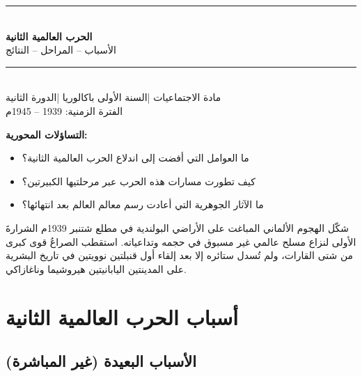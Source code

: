 \documentclass[12pt, a4paper]{article}
\begin{document}
\thispagestyle{empty}

\begin{center}
  {\color{mainblue}\rule{\linewidth}{2pt}}\\[6pt]
  {\LARGE\bfseries\color{mainblue} الحرب العالمية الثانية}\\[4pt]
  {\large\color{accentred} الأسباب – المراحل – النتائج}\\[6pt]
  {\color{mainblue}\rule{\linewidth}{2pt}}\\[10pt]
  {\normalsize\color{darkgray}
    مادة الاجتماعيات \quad|\quad السنة الأولى باكالوريا \quad|\quad الدورة الثانية}\\[4pt]
  {\small\color{darkgray} الفترة الزمنية: 1939 – 1945م}
\end{center}

\vspace{0.5cm}

\begin{sidebarbox}
\textbf{التساؤلات المحورية:}
\begin{itemize}[leftmargin=*, nosep]
  \item ما العوامل التي أفضت إلى اندلاع الحرب العالمية الثانية؟
  \item كيف تطورت مسارات هذه الحرب عبر مرحلتيها الكبيرتين؟
  \item ما الآثار الجوهرية التي أعادت رسم معالم العالم بعد انتهائها؟
\end{itemize}
\end{sidebarbox}

\vspace{0.3cm}

\noindent
شكّل الهجوم الألماني المباغت على الأراضي البولندية في مطلع شتنبر 1939م الشرارةَ
الأولى لنزاع مسلح عالمي غير مسبوق في حجمه وتداعياته.
استقطب الصراعُ قوى كبرى من شتى القارات، ولم تُسدل ستائره إلا بعد إلقاء أول قنبلتين
نوويتين في تاريخ البشرية على المدينتين اليابانيتين هيروشيما وناغازاكي.

\section{أسباب الحرب العالمية الثانية}

\subsection{الأسباب البعيدة (غير المباشرة)}
\end{document}
